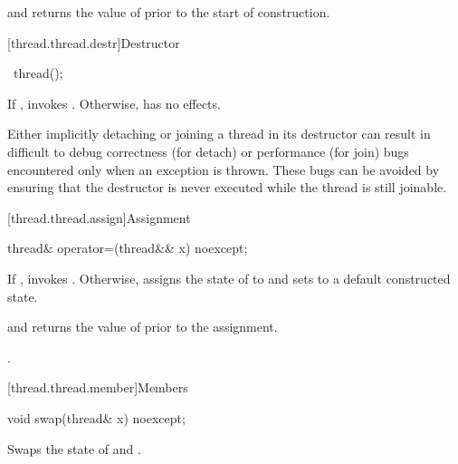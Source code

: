 \begin{itemdescr}
\pnum
\ensures
{} and  returns the
value of  prior to the start of construction.
\end{itemdescr}

[thread.thread.destr]{Destructor}

%
\begin{itemdecl}
~thread();
\end{itemdecl}

\begin{itemdescr}
\pnum
\effects
If , invokes .
Otherwise, has no effects.
\begin{note}
Either implicitly detaching or joining a  thread in its
destructor can result in difficult to debug correctness (for detach) or performance
(for join) bugs encountered only when an exception is thrown.
These bugs can be avoided by ensuring that
the destructor is never executed while the thread is still joinable.
\end{note}
\end{itemdescr}

[thread.thread.assign]{Assignment}

%
\begin{itemdecl}
thread& operator=(thread&& x) noexcept;
\end{itemdecl}

\begin{itemdescr}
\pnum
\effects
If , invokes .
Otherwise, assigns the
state of  to  and sets  to a default constructed state.

\pnum
\ensures
{} and  returns the value of
 prior to the assignment.

\pnum
\returns
{}.
\end{itemdescr}

[thread.thread.member]{Members}

%
\begin{itemdecl}
void swap(thread& x) noexcept;
\end{itemdecl}

\begin{itemdescr}
\pnum
\effects
Swaps the state of  and .
\end{itemdescr}

